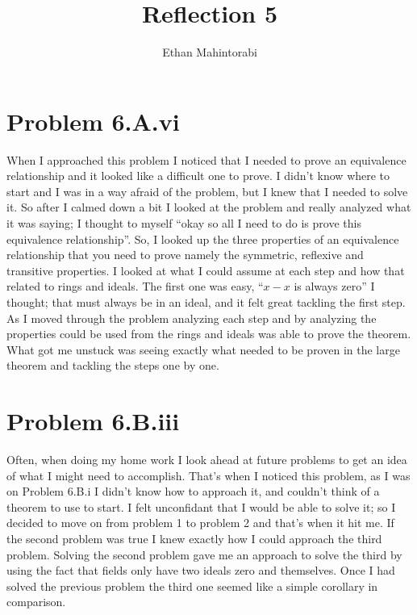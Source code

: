 \documentclass{article}
\begin{document}
  
  \title{Reflection 5}
  \author{Ethan Mahintorabi}
  
  \maketitle

  
  \section*{Problem 6.A.vi}
    When I approached this problem I noticed that I needed to prove an equivalence relationship and it looked like a difficult one to prove. I didn't know where to start and I was in a way afraid of the problem, but I knew that I needed to solve it. So after I calmed down a bit I looked at the problem and really analyzed what it was saying; I thought to myself ``okay so all I need to do is prove this equivalence relationship''. So, I looked up the three properties of an equivalence relationship that you need to prove namely the symmetric, reflexive and transitive properties. I looked at what I could assume at each step and how that related to rings and ideals. The first one was easy, ``$x-x$ is always zero'' I thought; that must always be in an ideal, and it felt great tackling the first step. As I moved through the problem analyzing each step and by analyzing the properties could be used from the rings and ideals was able to prove the theorem. What got me unstuck was seeing exactly what needed to be proven in the large theorem and tackling the steps one by one.

  \section*{Problem 6.B.iii}
    Often, when doing my home work I look ahead at future problems to get an idea of what I might need to accomplish. That's when I noticed this problem, as I was on Problem 6.B.i I didn't know how to approach it, and couldn't think of a theorem to use to start. I felt unconfidant that I would be able to solve it; so I decided to move on from problem 1 to problem 2 and that's when it hit me. If the second problem was true I knew exactly how I could approach the third problem. Solving the second problem gave me an approach to solve the third by using the fact that fields only have two ideals zero and themselves. Once I had solved the previous problem the third one seemed like a simple corollary in comparison. 

    
    
  
\end{document}

